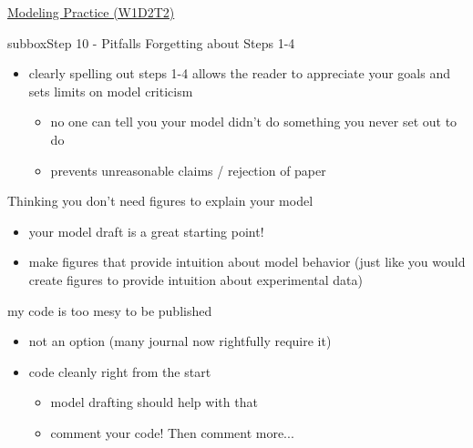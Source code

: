 \begin{textbox}{\href{https://compneuro.neuromatch.io/tutorials/W1D2_ModelingPractice/W1D2_Intro.html}{Modeling Practice  (W1D2T2)} }
\begin{subbox}{subbox}{Step 10 - Pitfalls }
Forgetting about Steps 1-4
\begin{itemize}
    \item clearly spelling out steps 1-4 allows the reader to appreciate your goals and sets limits on model criticism
    \begin{itemize}
    \item no one can tell you your model didn't do something you never set out to do
       \item prevents unreasonable claims / rejection of paper \end{itemize}
\end{itemize}

Thinking you don't need figures to explain your model
\begin{itemize}
    \item  your model draft is a great starting point!  \item make figures that provide intuition about model behavior (just like you would create figures to provide intuition about experimental data) \end{itemize}

my code is too mesy to be published
\begin{itemize}
    \item not an option (many journal now rightfully require it)
     \item  code cleanly right from the start
    \begin{itemize}
    \item model drafting should help with that
      \item  comment your code! Then comment more...
  \end{itemize}
\end{itemize}

\end{subbox}
 
 
\end{textbox}
